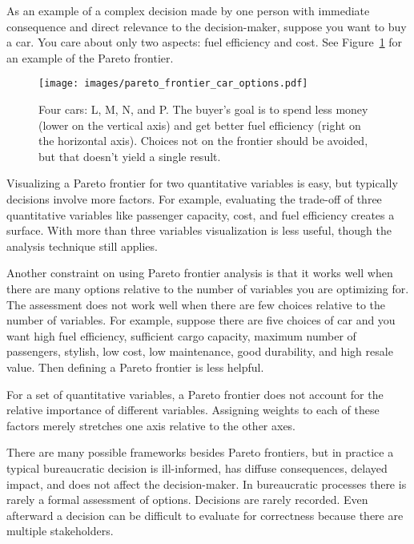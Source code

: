 As an example of a complex decision made by one person with immediate consequence and direct relevance to the decision-maker, suppose you want to buy a car. You care about only two aspects: fuel efficiency and cost. See Figure~\ref{fig:pareto_frontier_cars} for an example of the Pareto frontier.

\begin{figure}[ht]
    \centering
    \texttt{[image: images/pareto\_frontier\_car\_options.pdf]}
    \caption{Four cars: L, M, N, and P. The buyer's goal is to spend less money (lower on the vertical axis) and get better fuel efficiency (right on the horizontal axis). Choices not on the frontier should be avoided, but that doesn't yield a single result.}
    \label{fig:pareto_frontier_cars}
\end{figure}

Visualizing a Pareto frontier for two quantitative variables is easy, but typically decisions involve more factors. For example, evaluating the trade-off of three quantitative variables like 
passenger capacity, cost, and fuel efficiency creates a surface. With more than three variables visualization is less useful, though the analysis technique still applies. 

Another constraint on using Pareto frontier analysis is that it works well when there are many options relative to the number of variables you are optimizing for. 
The assessment does not work well when there are few choices relative to the number of variables. For example, suppose there are five choices of car and you want high fuel efficiency, sufficient cargo capacity, maximum number of passengers, stylish, low cost, low maintenance, good durability, and high resale value. Then defining a Pareto frontier is less helpful.

For a set of quantitative variables, a Pareto frontier does not account for the relative importance of different variables. Assigning weights to each of these factors merely stretches one axis relative to the other axes. 

There are many possible %
frameworks besides Pareto frontiers, but in practice a typical bureaucratic decision is ill-informed, has diffuse consequences, delayed impact, and does not affect the decision-maker. In bureaucratic processes there is rarely a formal assessment of options. 
Decisions are rarely recorded. 
Even afterward a decision can be difficult to evaluate for correctness because there are multiple stakeholders.

